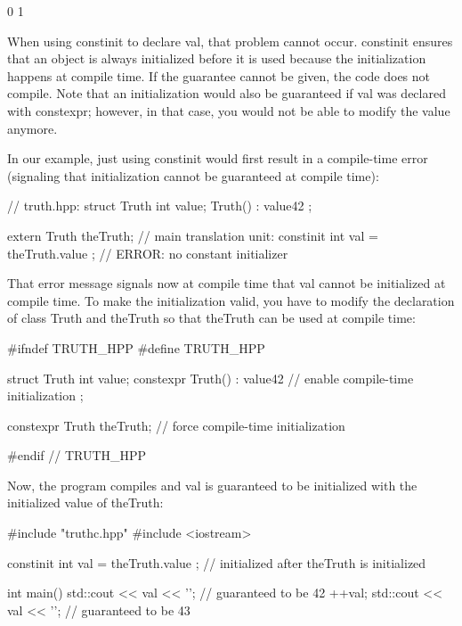 \begin{shell}
0 
1
\end{shell}

When using constinit to declare val, that problem cannot occur. constinit ensures that an object is always initialized before it is used because the initialization happens at compile time. If the guarantee cannot be given, the code does not compile. Note that an initialization would also be guaranteed if val was declared with constexpr; however, in that case, you would not be able to modify the value anymore.

In our example, just using constinit would first result in a compile-time error (signaling that initialization cannot be guaranteed at compile time):

\begin{cpp}
// truth.hpp:
struct Truth {
	int value;
	Truth() : value{42} {
	}
};

extern Truth theTruth;
// main translation unit:
constinit int val = theTruth.value ; // ERROR: no constant initializer
\end{cpp}

That error message signals now at compile time that val cannot be initialized at compile time. To make the initialization valid, you have to modify the declaration of class Truth and theTruth so that theTruth can be used at compile time:


\begin{cpp}
#ifndef TRUTH_HPP
#define TRUTH_HPP

struct Truth {
	int value;
	constexpr Truth() : value{42} { // enable compile-time initialization
	}
};

constexpr Truth theTruth; // force compile-time initialization

#endif // TRUTH_HPP
\end{cpp}

Now, the program compiles and val is guaranteed to be initialized with the initialized value of theTruth:


\begin{cpp}
#include "truthc.hpp"
#include <iostream>

constinit int val = theTruth.value ; // initialized after theTruth is initialized

int main()
{
	std::cout << val << '\n'; // guaranteed to be 42
	++val;
	std::cout << val << '\n'; // guaranteed to be 43
}
\end{cpp}

